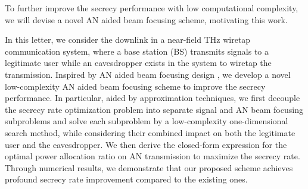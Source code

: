 \documentclass[10pt,technote]{IEEEtran}
\newcommand{\1}{\mathbbm{1}}
\begin{document}
To further improve the secrecy performance with low computational complexity, we will devise a novel AN aided beam focusing scheme, motivating this work. 

In this letter, we consider the downlink in a near-field THz wiretap communication system, where a base station (BS) transmits signals to a legitimate user while an eavesdropper exists in the system to wiretap the transmission. %
Inspired by AN aided beam focusing design \cite{zhang2024performanceanalysislowcomplexitybeamforming}, we develop a novel low-complexity AN aided beam focusing scheme to improve the secrecy performance. In particular, aided by approximation techniques, we first decouple the secrecy rate optimization problem into separate signal and AN beam focusing subproblems and solve each subproblem by a low-complexity one-dimensional search method, while considering their combined impact on both the legitimate user and the eavesdropper. %
We then derive the closed-form expression for the optimal power allocation ratio on AN transmission to maximize the secrecy rate. Through numerical results, we demonstrate that our proposed scheme achieves profound secrecy rate improvement compared to the existing ones.
\end{document}
